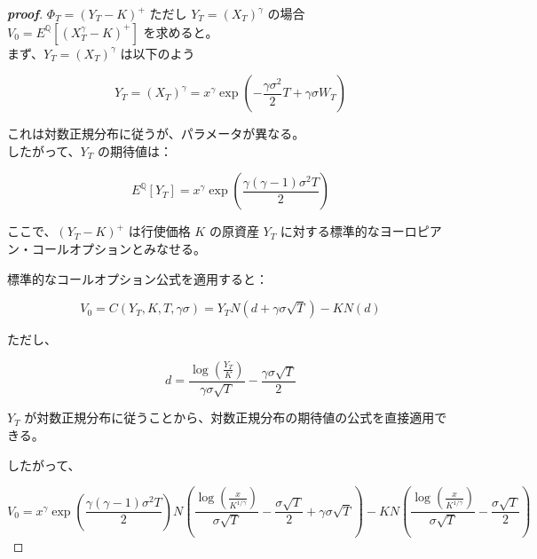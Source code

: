 \documentclass[a4paper,11pt]{jsarticle}
\begin{document}
\begin{proof}[\textbf{proof}]
$\Phi_T = (Y_T - K)^+$ ただし $Y_T = (X_T)^\gamma$ の場合\\

$V_0 = E^\mathbb{Q}[(X_T^\gamma - K)^+]$ を求めると。\\  

まず、$Y_T = (X_T)^\gamma$ は以下のよう  

\[  
Y_T = (X_T)^\gamma = x^\gamma \exp\left(-\frac{\gamma\sigma^2}{2}T + \gamma\sigma W_T\right)  
\]  

これは対数正規分布に従うが、パラメータが異なる。 \\  

したがって、$Y_T$ の期待値は：  

\[  
E^\mathbb{Q}[Y_T] = x^\gamma \exp\left(\frac{\gamma(\gamma-1)\sigma^2T}{2}\right)  
\]  

ここで、$(Y_T - K)^+$ は行使価格 $K$ の原資産 $Y_T$ に対する標準的なヨーロピアン・コールオプションとみなせる。  

標準的なコールオプション公式を適用すると：  

\[  
V_0 = C(Y_T, K, T, \gamma\sigma) = Y_TN\left(d + \gamma\sigma\sqrt{T}\right) - KN(d)  
\]  

ただし、  

\[  
d = \frac{\log\left(\frac{Y_T}{K}\right)}{\gamma\sigma\sqrt{T}} - \frac{\gamma\sigma\sqrt{T}}{2}  
\]  
 

$Y_T$ が対数正規分布に従うことから、対数正規分布の期待値の公式を直接適用できる。  

したがって、  

\[  
V_0 = x^\gamma \exp\left(\frac{\gamma(\gamma-1)\sigma^2T}{2}\right)N\left(\frac{\log\left(\frac{x}{K^{1/\gamma}}\right)}{\sigma\sqrt{T}} - \frac{\sigma\sqrt{T}}{2} + \gamma\sigma\sqrt{T}\right) - KN\left(\frac{\log\left(\frac{x}{K^{1/\gamma}}\right)}{\sigma\sqrt{T}} - \frac{\sigma\sqrt{T}}{2}\right)  
\]
  
\end{proof}
\end{document}
